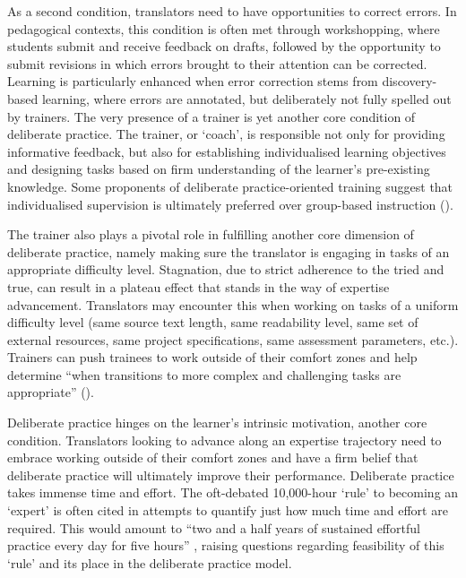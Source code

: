 \documentclass[output=paper]{langscibook}
\begin{document}
As a second condition, translators need to have opportunities to correct errors. In pedagogical contexts, this condition is often met through workshopping, where students submit and receive feedback on drafts, followed by the opportunity to submit revisions in which errors brought to their attention can be corrected. Learning is particularly enhanced when error correction stems from discovery-based learning, where errors are annotated, but deliberately not fully spelled out by trainers. The very presence of a trainer is yet another core condition of deliberate practice. The trainer, or ‘coach’, is responsible not only for providing informative feedback, but also for establishing individualised learning objectives \citep{millerchow20} and designing tasks based on firm understanding of the learner’s pre-existing knowledge. Some proponents of deliberate practice-oriented training suggest that individualised supervision is ultimately preferred over group-based instruction (\citealt[367]{ericssonkrampe93}).

The trainer also plays a pivotal role in fulfilling another core dimension of deliberate practice, namely making sure the translator is engaging in tasks of an appropriate difficulty level. Stagnation, due to strict adherence to the tried and true, can result in a plateau effect that stands in the way of expertise advancement. Translators may encounter this when working on tasks of a uniform difficulty level (same source text length, same readability level, same set of external resources, same project specifications, same assessment parameters, etc.). Trainers can push trainees to work outside of their comfort zones and help determine “when transitions to more complex and challenging tasks are appropriate” (\citealt[367]{ericssonkrampe93}).

Deliberate practice hinges on the learner’s intrinsic motivation, another core condition. Translators looking to advance along an expertise trajectory need to embrace working outside of their comfort zones and have a firm belief that deliberate practice will ultimately improve their performance. Deliberate practice takes immense time and effort. The oft-debated 10,000-hour ‘rule’ to becoming an ‘expert’ \citep{gladwell_outliers11} is often cited in attempts to quantify just how much time and effort are required. This would amount to “two and a half years of sustained effortful practice every day for five hours” \citep[173--174]{shreve2019}, raising questions regarding feasibility of this ‘rule’ and its place in the deliberate practice model.
\end{document}
